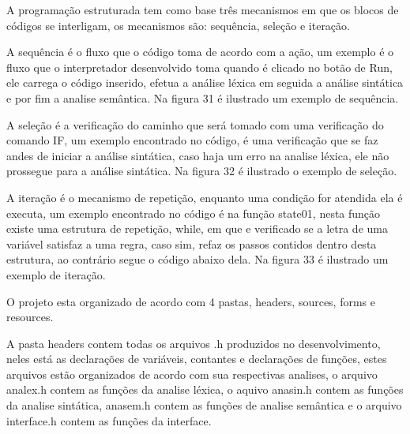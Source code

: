 \documentclass[12pt,oneside,a4paper,chapter=TITLE,section=TITLE,sumario=tradicional]{abntex2}
\begin{document}
A programação estruturada tem como base três mecanismos em que os blocos de códigos se interligam, os mecanismos são: sequência, seleção e iteração\cite{ivan2003}.

A sequência é o fluxo que o código toma de acordo com a ação\cite{ivan2003}, um exemplo é o fluxo que o interpretador desenvolvido toma quando é clicado no botão de Run, ele carrega o código inserido, efetua a análise léxica em seguida a análise sintática e por fim a analise semântica. Na figura 31 é ilustrado um exemplo de sequência.

\begin{figure}[htb]
\end{figure}

A seleção é a verificação do caminho que será tomado com uma verificação do comando IF\cite{ivan2003}, um exemplo encontrado no código, é uma verificação que se faz andes de iniciar a análise sintática, caso haja um erro na analise léxica, ele não prossegue para a análise sintática. Na figura 32 é ilustrado o exemplo de seleção.

\begin{figure}[htb]
\end{figure}

A iteração é o mecanismo de repetição, enquanto uma condição for atendida ela é executa\cite{ivan2003}, um exemplo encontrado no código é na função state01, nesta função existe uma estrutura de repetição, while, em que e verificado se a letra de uma variável satisfaz a uma regra, caso sim, refaz os passos contidos dentro desta estrutura, ao contrário segue o código abaixo dela. Na figura 33 é ilustrado um exemplo de iteração.

\begin{figure}[htb]
\end{figure}

O projeto esta organizado de acordo com 4 pastas, headers, sources, forms e resources.

A pasta headers contem todas os arquivos .h produzidos no desenvolvimento, neles está as declarações de variáveis, contantes e declarações de funções, estes arquivos estão organizados de acordo com sua respectivas analises, o arquivo analex.h contem as funções da analise léxica, o aquivo anasin.h contem as funções da analise sintática, anasem.h contem as funções de analise semântica e o arquivo interface.h contem as funções da interface.
\end{document}
